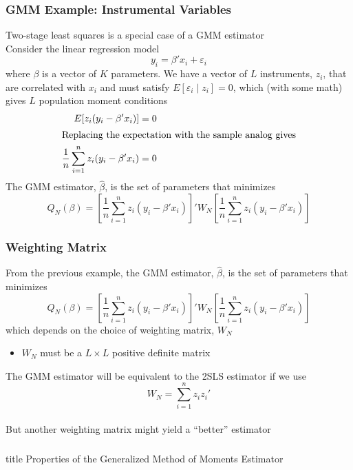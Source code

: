 \documentclass{beamer}
\begin{document}
\begin{frame}\frametitle{GMM Example: Instrumental Variables}
    Two-stage least squares is a special case of a GMM estimator \\
    \vspace{2ex}
    Consider the  linear regression model
    $$y_i = \beta' x_i + \varepsilon_i$$
    where $\beta$ is a vector of $K$ parameters. We have a vector of $L$ instruments, $z_i$, that are correlated with $x_i$ and must satisfy $E[\varepsilon_i \mid z_i] = 0$, which (with some math) gives $L$ population moment conditions
    \begin{align*}
    	E[z_i (y_i - \beta' x_i)] &= 0 \\
    	\intertext{Replacing the expectation with the sample analog gives}
    	\frac{1}{n} \sum_{i = 1}^n z_i (y_i - \beta' x_i) &= 0
    \end{align*}
    The GMM estimator, $\hat{\beta}$, is the set of parameters that minimizes
    $$Q_N(\beta) = \left[ \frac{1}{n} \sum_{i = 1}^n z_i (y_i - \beta' x_i) \right]' W_N \left[ \frac{1}{n} \sum_{i = 1}^n z_i (y_i - \beta' x_i) \right]$$
\end{frame}

\begin{frame}\frametitle{Weighting Matrix}
    From the previous example, the GMM estimator, $\hat{\beta}$, is the set of parameters that minimizes
    $$Q_N(\beta) = \left[ \frac{1}{n} \sum_{i = 1}^n z_i (y_i - \beta' x_i) \right]' W_N \left[ \frac{1}{n} \sum_{i = 1}^n z_i (y_i - \beta' x_i) \right]$$
    which depends on the choice of weighting matrix, $W_N$
    \begin{itemize}
    	\item $W_N$ must be a $L \times L$ positive definite matrix
    \end{itemize}
    \vspace{2ex}
    The GMM estimator will be equivalent to the 2SLS estimator if we use
    $$W_N = \sum_{i = 1}^n z_i z_i'$$ \\
    \vspace{2ex}
    But another weighting matrix might yield a ``better'' estimator
\end{frame}

\begin{frame}\frametitle{}
    \vfill
    \centering
    \begin{beamercolorbox}[center]{title}
        \Large Properties of the Generalized Method of Moments Estimator
    \end{beamercolorbox}
    \vfill
\end{frame}
\end{document}

